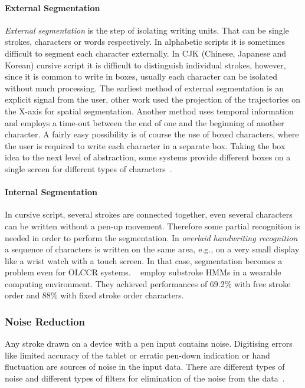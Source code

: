 \paragraph{External Segmentation}
\label{sec:externasegmentation}
\emph{External segmentation} is the step of isolating writing units. That can be
single strokes, characters or words respectively. In alphabetic scripts it is 
sometimes difficult to segment each character externally. In CJK (Chinese, 
Japanese and Korean) cursive script it is difficult to distinguish individual 
strokes, however, since it is common to write in boxes, usually each character 
can be isolated without much processing.
The earliest method of external segmentation is an explicit signal from the user,
other work used the projection of the trajectories on the X-axis for spatial
segmentation. Another method uses temporal information and employs a time-out
between the end of one and the beginning of another character.
A fairly easy possibility is of course the use of boxed characters, where the 
user is required to write each character in a separate box.
Taking the box idea to the next level of abstraction, some systems provide 
different boxes on a single screen for different types of 
characters~.

\paragraph{Internal Segmentation}
\label{sec:internalsegmentation}
In cursive script, several strokes are connected together, even several 
characters can be written without a pen-up movement. Therefore some partial 
recognition is needed in order to perform the segmentation.
In \emph{overlaid handwriting recognition} a sequence of characters is written 
on the same area, e.g., on a very small display like a wrist watch with a touch 
screen. In that case, segmentation becomes a problem even for OLCCR systems.
~\citeyear{Shimodaira2003} employ substroke HMMs in a wearable computing 
environment. They achieved performances of 69.2\% with free stroke order
and 88\% with fixed stroke order characters.

\subsubsection{Noise Reduction} 
\label{sec:noisereduction}
Any stroke drawn on a device with a pen input contains noise. Digitising errors
like limited accuracy of the tablet or erratic pen-down indication or hand 
fluctuation are sources of noise in the input data.  There are different types 
of noise and different types of filters for elimination of the noise from the 
data~.

